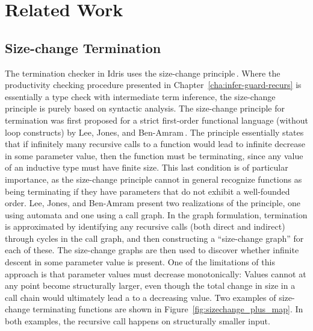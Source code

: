 \chapter{Related Work}
\label{cha:related-work}


\section{Size-change Termination}
The termination checker in Idris uses the size-change
principle\,\citep{BradyIdrisImpl13}. Where the productivity checking procedure
presented in Chapter~\ref{cha:infer-guard-recurs} is essentially a type check
with intermediate term inference, the size-change principle is purely based on
syntactic analysis. The size-change principle for termination was first proposed
for a strict first-order functional language (without loop constructs) by Lee,
Jones, and Ben-Amram\,\citep{LeeJones01SizeChange}. The principle essentially
states that if infinitely many recursive calls to a function would lead to
infinite decrease in some parameter value, then the function must be
terminating, since any value of an inductive type must have finite size. This
last condition is of particular importance, as the size-change principle cannot
in general recognize functions as being terminating if they have parameters that
do not exhibit a well-founded order. Lee, Jones, and Ben-Amram present two
realizations of the principle, one using automata and one using a call graph. In
the graph formulation, termination is approximated by identifying any recursive
calls (both direct and indirect) through cycles in the call graph, and then
constructing a ``size-change graph'' for each of these. The size-change graphs
are then used to discover whether infinite descent in some parameter value is
present. One of the limitations of this approach is that parameter values must
decrease monotonically: Values cannot at any point become structurally larger,
even though the total change in size in a call chain would ultimately lead a to
a decreasing value. Two examples of size-change terminating functions are shown
in Figure~\ref{fig:sizechange_plus_map}. In both examples, the recursive call
happens on structurally smaller input.

